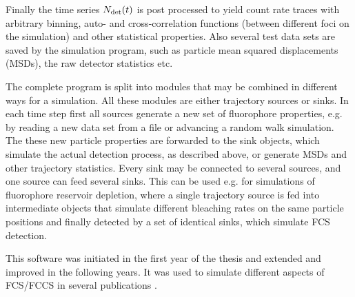 Finally the time series  ${N}_{\text{det}}(t)$ is post processed to yield count rate traces with arbitrary binning, auto- and cross-correlation functions (between different foci on the simulation) and other statistical properties. Also several test data sets are saved by the simulation program, such as particle mean squared displacements (MSDs), the raw detector statistics etc.

The complete program is split into modules that may be combined in different ways for a simulation. All these modules are either trajectory sources or sinks. In each time step first all sources generate a new set of fluorophore properties, e.g. by reading a new data set from a file or advancing a random walk simulation. The these new particle properties are forwarded to the sink objects, which simulate the actual detection process, as described above, or generate MSDs and other trajectory statistics. Every sink may be connected to several sources, and one source can feed several sinks. This can be used e.g. for simulations of fluorophore reservoir depletion, where a single trajectory source is fed into intermediate objects that simulate different bleaching rates on the same particle positions and finally detected by a set of identical sinks, which simulate FCS detection.

This software was initiated in the first year of the thesis and extended and improved in the following years. It was used to simulate different aspects of FCS/FCCS in several publications \cite{WOCJAN2009,BUCHHO2012,SINGHKRIEGER2013,KRIEGE2014}.



